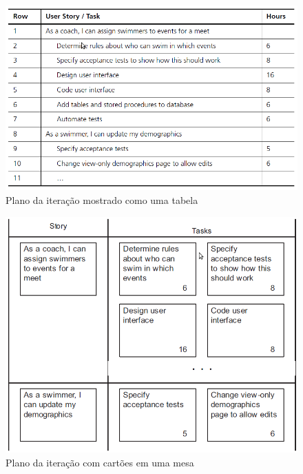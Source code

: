 \documentclass[a4paper,abntfigtabnum,noindentfirst]{abnt}
\begin{document}
\begin{figure}
  \caption{Plano da iteração mostrado como uma tabela}
  \label{plano-da-iteracao-como-tabela}
  \begin{center}
  \includegraphics[scale=0.6]{plano-da-iteracao-como-tabela}
  \end{center}
\end{figure}

\begin{figure}
  \caption{Plano da iteração com cartões em uma mesa}
  \label{plano-da-iteracao-como-cartoes}
  \begin{center}
  \includegraphics[scale=0.6]{plano-da-iteracao-como-cartoes}
  \end{center}
\end{figure}
\end{document}
